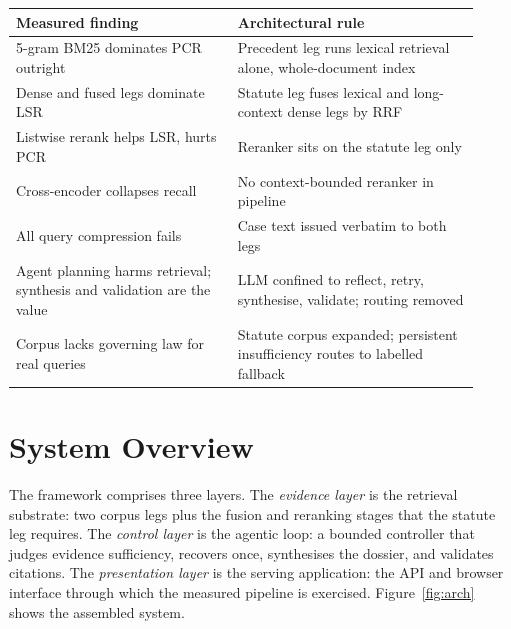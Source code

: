 \documentclass{mnnit}
\makeatletter
\newcommand{\tabcaption}[1]{\def\@captype{table}\caption{#1}}
\makeatother
\begin{document}
\begin{center}
\small
\tabcaption{Mapping of experimental findings to architectural
decisions.}
\label{tab:find2arch}
\vspace{2mm}
\begin{tabular}{p{0.44\linewidth}p{0.48\linewidth}}
\toprule
Measured finding & Architectural rule \\
\midrule
5-gram BM25 dominates PCR outright & Precedent leg runs lexical
retrieval alone, whole-document index \\
Dense and fused legs dominate LSR & Statute leg fuses lexical and
long-context dense legs by RRF \\
Listwise rerank helps LSR, hurts PCR & Reranker sits on the
statute leg only \\
Cross-encoder collapses recall & No context-bounded reranker in
pipeline \\
All query compression fails & Case text issued verbatim to both
legs \\
Agent planning harms retrieval; synthesis and validation are the
value & LLM confined to reflect, retry, synthesise, validate;
routing removed \\
Corpus lacks governing law for real queries & Statute corpus
expanded; persistent insufficiency routes to labelled fallback \\
\bottomrule
\end{tabular}
\end{center}

\section{System Overview}
The framework comprises three layers. The \emph{evidence layer}
is the retrieval substrate: two corpus legs plus the fusion and
reranking stages that the statute leg requires. The
\emph{control layer} is the agentic loop: a bounded controller
that judges evidence sufficiency, recovers once, synthesises the
dossier, and validates citations. The \emph{presentation layer}
is the serving application: the API and browser interface through
which the measured pipeline is exercised. Figure~\ref{fig:arch}
shows the assembled system.
\end{document}
